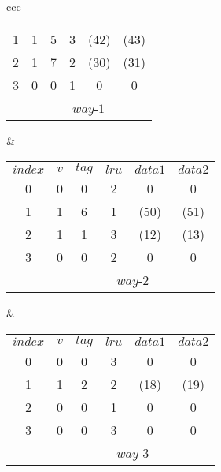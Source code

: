 \documentclass[dvipdfmx,titlepage, 11pt, a4paper]{jsarticle}%
\begin{document}
\begin{enumerate}[(1)]
\begin{enumerate}[(a)]
\begin{table}[H]
{\begin{tabular}{ccc}
\begin{tabular}{cccccc}
          \cline{2-6}
          1 & \multicolumn{1}{|c|}{1} & \multicolumn{1}{|c|}{5} & \multicolumn{1}{|c|}{3} & \multicolumn{1}{|c|}{(42)} & \multicolumn{1}{|c|}{(43)}\\
          \cline{2-6}
          2 & \multicolumn{1}{|c|}{1} & \multicolumn{1}{|c|}{7} & \multicolumn{1}{|c|}{2} & \multicolumn{1}{|c|}{(30)} & \multicolumn{1}{|c|}{(31)}\\
          \cline{2-6}
          3 & \multicolumn{1}{|c|}{0} & \multicolumn{1}{|c|}{0} & \multicolumn{1}{|c|}{1} & \multicolumn{1}{|c|}{0} & \multicolumn{1}{|c|}{0}\\
          \cline{2-6}
          &\multicolumn{5}{c}{$way$-$1$}
        \end{tabular}
        & 
        \begin{tabular}{cccccc}
          $index$ & $v$ & $tag$ & $lru$ & $data1$ & $data2$\\
          \cline{2-6}
          0 & \multicolumn{1}{|c|}{0} & \multicolumn{1}{|c|}{0} & \multicolumn{1}{|c|}{2} & \multicolumn{1}{|c|}{0} & \multicolumn{1}{|c|}{0}\\
          \cline{2-6}
          1 & \multicolumn{1}{|c|}{1} & \multicolumn{1}{|c|}{6} & \multicolumn{1}{|c|}{1} & \multicolumn{1}{|c|}{(50)} & \multicolumn{1}{|c|}{(51)}\\
          \cline{2-6}
          2 & \multicolumn{1}{|c|}{1} & \multicolumn{1}{|c|}{1} & \multicolumn{1}{|c|}{3} & \multicolumn{1}{|c|}{(12)} & \multicolumn{1}{|c|}{(13)}\\
          \cline{2-6}
          3 & \multicolumn{1}{|c|}{0} & \multicolumn{1}{|c|}{0} & \multicolumn{1}{|c|}{2} & \multicolumn{1}{|c|}{0} & \multicolumn{1}{|c|}{0}\\
          \cline{2-6}
          &\multicolumn{5}{c}{$way$-$2$}
        \end{tabular}
        & 
        \begin{tabular}{cccccc}
          $index$ & $v$ & $tag$ & $lru$ & $data1$ & $data2$\\
          \cline{2-6}
          0 & \multicolumn{1}{|c|}{0} & \multicolumn{1}{|c|}{0} & \multicolumn{1}{|c|}{3} & \multicolumn{1}{|c|}{0} & \multicolumn{1}{|c|}{0}\\
          \cline{2-6}
          1 & \multicolumn{1}{|c|}{1} & \multicolumn{1}{|c|}{2} & \multicolumn{1}{|c|}{2} & \multicolumn{1}{|c|}{(18)} & \multicolumn{1}{|c|}{(19)}\\
          \cline{2-6}
          2 & \multicolumn{1}{|c|}{0} & \multicolumn{1}{|c|}{0} & \multicolumn{1}{|c|}{1} & \multicolumn{1}{|c|}{0} & \multicolumn{1}{|c|}{0}\\
          \cline{2-6}
          3 & \multicolumn{1}{|c|}{0} & \multicolumn{1}{|c|}{0} & \multicolumn{1}{|c|}{3} & \multicolumn{1}{|c|}{0} & \multicolumn{1}{|c|}{0}\\
          \cline{2-6}
          &\multicolumn{5}{c}{$way$-$3$}
        \end{tabular}
      \end{tabular}%
      }
    \end{table}
  \end{enumerate}
\end{enumerate}
\end{document}
